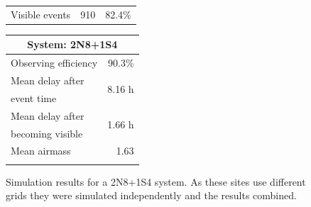\begin{colsection}
\begin{figure}[p]
\begin{center}
\begin{minipage}[t]{0.45\linewidth}
\begin{tabular}{lrr}
                \midrule
                Visible events & 910 &  82.4\% \\
            \end{tabular}
        \end{minipage}
        \begin{minipage}[t]{0.37\linewidth}\vspace{0pt}
            \begin{tabular}{lr}
                \multicolumn{2}{c}{\textbf{System: 2N8+1S4}} \\
                \midrule
                Observing efficiency & 90.3\% \\
                \midrule
                Mean delay after     & \multirow{2}{*}{8.16 h} \\
                event time           & \\
                Mean delay after     & \multirow{2}{*}{1.66 h} \\
                becoming visible     & \\
                \midrule
                Mean airmass         & 1.63 \\
                & \\
            \end{tabular}
        \end{minipage}
    \end{center}
    \caption[GW simulation results: 2N8+1S4 system]{
        Simulation results for a 2N8+1S4 system. As these sites use different grids they were simulated independently and the results combined.
    }\label{fig:gw_sim_2n8+1s4}
\end{figure}


\end{colsection}
